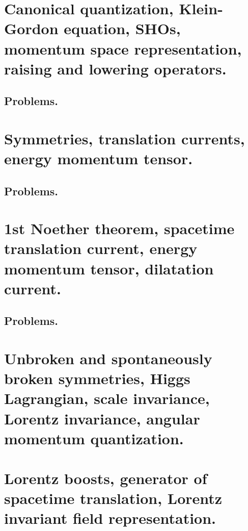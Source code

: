    \chapter{Canonical quantization, Klein-Gordon equation, SHOs, momentum space representation, raising and lowering operators.}
      
      
      
      \section{Problems.}
         
         
         
         
         
   \chapter{Symmetries, translation currents, energy momentum tensor.}
      
      
      \section{Problems.}
         
   \chapter{1st Noether theorem, spacetime translation current, energy momentum tensor, dilatation current.}
      
      \section{Problems.}
         
         
         
         
   \chapter{Unbroken and spontaneously broken symmetries, Higgs Lagrangian, scale invariance, Lorentz invariance, angular momentum quantization.}
      
   \chapter{Lorentz boosts, generator of spacetime translation, Lorentz invariant field representation.}
      
